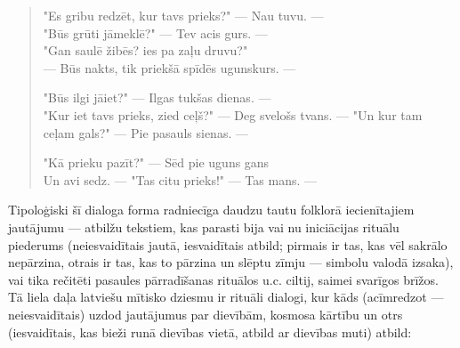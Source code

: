 \documentclass[11pt]{article}
\begin{document}
\begin{quote}
"Es gribu redzēt, kur tavs prieks?" --- Nau tuvu. ---\\
"Būs grūti jāmeklē?" --- Tev acis gurs. ---\\
"Gan saulē žibēs? ies pa zaļu druvu?"\\
--- Būs nakts, tik priekšā spīdēs ugunskurs. ---

"Būs ilgi jāiet?" --- Ilgas tukšas dienas. ---\\
"Kur iet tavs prieks, zied ceļš?" --- Deg svelošs tvans. ---
"Un kur tam ceļam gals?" --- Pie pasauls sienas. ---

"Kā prieku pazīt?" --- Sēd pie uguns gans\\
Un avi sedz. --- "Tas citu prieks!" --- Tas mans. ---
\end{quote}

Tipoloģiski šī dialoga forma radniecīga daudzu
tautu folklorā iecienītajiem jautājumu --- atbilžu
tekstiem, kas parasti bija vai nu
iniciācijas rituālu piederums
(neiesvaidītais jautā, iesvaidītais atbild; pirmais ir tas,
kas vēl sakrālo nepārzina, otrais ir tas, kas to pārzina un
slēptu zīmju --- simbolu valodā izsaka), vai tika
rečitēti pasaules pārradīšanas rituālos u.c. ciltij,
saimei svarīgos brīžos. Tā liela daļa latviešu
mītisko dziesmu ir rituāli dialogi, kur kāds (acīmredzot ---
neiesvaidītais) uzdod jautājumus par dievībām, kosmosa
kārtību un otrs (iesvaidītais, kas bieži runā dievības
vietā, atbild ar dievības muti) atbild:
\end{document}
